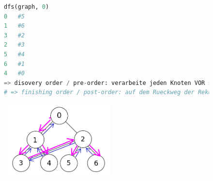 \documentclass[11pt, fleqn]{scrreprt}
\begin{document}
	\newpage
	\begin{figure}[htbp]
		\begin{minipage}[t]{11cm}
			\vspace{0cm}
			\begin{lstlisting}[language=Python]
dfs(graph, 0)
0   #5
1   #6
3   #2
2   #3
5   #4
6   #1
4   #0
=> disovery order / pre-order: verarbeite jeden Knoten VOR seinen Nachbarn -> Hinweg der Rekursion
# => finishing order / post-order: auf dem Rueckweg der Rekursion nach den Nachbarn
			\end{lstlisting}
		\end{minipage}
		\begin{minipage}[t]{6cm}
			\vspace{0.0cm}
			\includegraphics[width=6cm,height=4cm,keepaspectratio]{./Pictures/DFS.png}
		\end{minipage}
	\end{figure}
	
\end{document}
